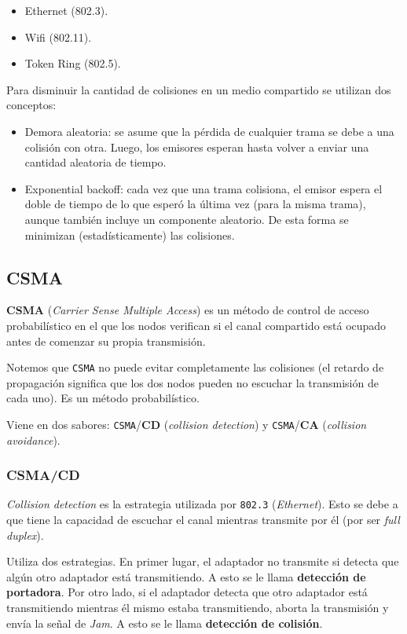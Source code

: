 \documentclass[]{article}
\begin{document}
\begin{itemize}
    \item Ethernet (802.3).
    \item Wifi (802.11).
    \item Token Ring (802.5).
\end{itemize}

Para disminuir la cantidad de colisiones en un medio compartido se utilizan dos conceptos:
\begin{itemize}
    \item Demora aleatoria: se asume que la pérdida de cualquier trama se debe a una colisión con otra. Luego, los emisores esperan hasta volver a enviar una cantidad aleatoria de tiempo.
    \item Exponential backoff: cada vez que una trama colisiona, el emisor espera el doble de tiempo de lo que esperó la última vez (para la misma trama), aunque también incluye un componente aleatorio. De esta forma se minimizan (estadísticamente) las colisiones.
\end{itemize}

\subsection{CSMA}
\textbf{CSMA} (\emph{Carrier Sense Multiple Access}) es un método de control de acceso probabilístico en el que los nodos verifican si el canal compartido está ocupado antes de comenzar su propia transmisión.

Notemos que \texttt{CSMA} no puede evitar completamente las colisiones (el retardo de propagación significa que los dos nodos pueden no escuchar la transmisión de cada uno). Es un método probabilístico.

Viene en dos sabores: \texttt{CSMA}/\textbf{CD} (\emph{collision detection}) y \texttt{CSMA}/\textbf{CA} (\emph{collision avoidance}).

\subsubsection{CSMA/CD}

\emph{Collision detection} es la estrategia utilizada por \texttt{802.3} (\emph{Ethernet}). Esto se debe a que tiene la capacidad de escuchar el canal mientras transmite por él (por ser \emph{full duplex}).

 Utiliza dos estrategias. En primer lugar, el adaptador no transmite si detecta que algún otro adaptador está transmitiendo. A esto se le llama \textbf{detección de portadora}. Por otro lado, si el adaptador detecta que otro adaptador está transmitiendo mientras él mismo estaba transmitiendo, aborta la transmisión y envía la señal de \emph{Jam}. A esto se le llama \textbf{detección de colisión}.
\end{document}
